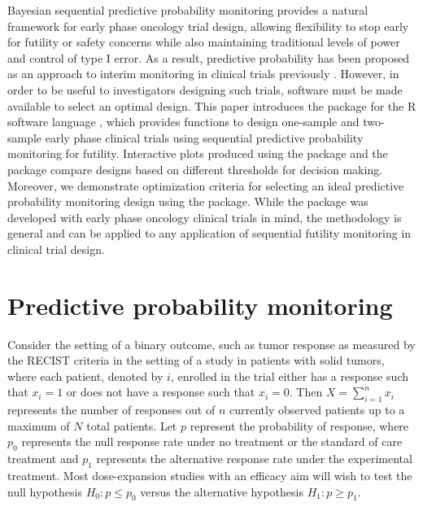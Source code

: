 Bayesian sequential predictive probability monitoring provides a natural
framework for early phase oncology trial design, allowing flexibility to
stop early for futility or safety concerns while also maintaining
traditional levels of power and control of type I error. As a result,
predictive probability has been proposed as an approach to interim
monitoring in clinical trials previously
\citep{Dmitrienko2006, Lee2008, Saville2014, Hobbs2018}. However, in
order to be useful to investigators designing such trials, software must
be made available to select an optimal design. This paper introduces the
 package for the R software language \citep{RCT2020}, which
provides functions to design one-sample and two-sample early phase
clinical trials using sequential predictive probability monitoring for
futility. Interactive plots produced using the  package
\citep{Wickham2016} and the  package \citep{Sievert2020}
compare designs based on different thresholds for decision making.
Moreover, we demonstrate optimization criteria for selecting an ideal
predictive probability monitoring design using the  package.
While the  package was developed with early phase oncology
clinical trials in mind, the methodology is general and can be applied
to any application of sequential futility monitoring in clinical trial
design.

\hypertarget{predictive-probability-monitoring}{%
\section{Predictive probability
monitoring}\label{predictive-probability-monitoring}}

Consider the setting of a binary outcome, such as tumor response as
measured by the RECIST criteria in the setting of a study in patients
with solid tumors, where each patient, denoted by \(i\), enrolled in the
trial either has a response such that \(x_i = 1\) or does not have a
response such that \(x_i = 0\). Then \(X = \sum_{i=1}^n x_i\) represents
the number of responses out of \(n\) currently observed patients up to a
maximum of \(N\) total patients. Let \(p\) represent the probability of
response, where \(p_0\) represents the null response rate under no
treatment or the standard of care treatment and \(p_1\) represents the
alternative response rate under the experimental treatment. Most
dose-expansion studies with an efficacy aim will wish to test the null
hypothesis \(H_0: p \leq p_0\) versus the alternative hypothesis
\(H_1: p \geq p_1\).

